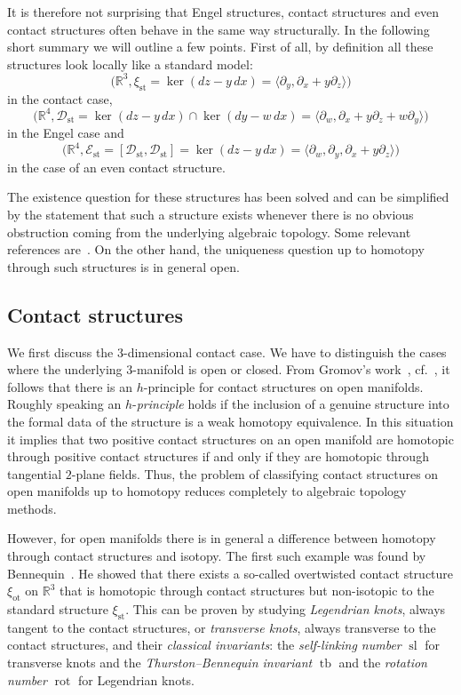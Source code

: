 \documentclass{amsart} %
\DeclareMathOperator{\tb}{tb}
\DeclareMathOperator{\rot}{rot}
\DeclareMathOperator{\slf}{sl}
\newcommand{\R}{\mathbb{R}}
\newcommand{\xist}{\xi_{\mathrm{st}}}
\newcommand{\xiot}{\xi_{\mathrm{ot}}}
\newcommand{\Dst}{\mathcal{D}_{\mathrm{st}}}
\newcommand{\Est}{\mathcal{E}_{\mathrm{st}}}
\theoremstyle{thm}
\theoremstyle{definition}
\begin{document}
It is therefore not surprising that Engel structures, contact structures and even contact structures often behave in the same way structurally. In the following short summary we will outline a few points. First of all, by definition all these structures look locally like a standard model:
$$\big(\R^3,\xist=\ker(dz-y\,dx)=\langle\partial_y,\partial_x+y\partial_z\rangle\big)$$ 
in the contact case, 
$$\big(\R^4,\Dst=\ker(dz-y\,dx)\cap\ker(dy-w\,dx)=\langle\partial_w,\partial_x+y\partial_z+w\partial_y\rangle\big)$$ 
in the Engel case and 
$$\big(\R^4,\Est=[\Dst,\Dst]=\ker(dz-y\,dx)=\langle\partial_w,\partial_y,\partial_x+y\partial_z\rangle\big)$$ 
in the case of an even contact structure.

The existence question for these structures has been solved and can be simplified by the statement that such a structure exists whenever there is no obvious obstruction coming from the underlying algebraic topology. Some relevant references are~\cite{Gr86, EM02, Ma71, El89, Ge08, Mc87, Vo09, CPPP17,PV20, BEM15}. On the other hand, the uniqueness question up to homotopy through such structures is in general open. 

\subsection{Contact structures}
We first discuss the $3$-dimensional contact case.  We have to distinguish the cases where the underlying $3$-manifold is open or closed. 
From Gromov's work~\cite{Gr86}, cf.~\cite{EM02}, it follows that there is an $h$-principle for contact structures on open manifolds. Roughly speaking an $h$-\textit{principle} holds if the inclusion of a genuine structure into the formal data of the structure is a weak homotopy equivalence. In this situation it implies that two positive contact structures on an open manifold are homotopic through positive contact structures if and only if they are homotopic through tangential $2$-plane fields. Thus, the problem of classifying contact structures on open manifolds up to homotopy reduces completely to algebraic topology methods. 

However, for open manifolds there is in general a difference between homotopy through contact structures and isotopy. The first such example was found by Bennequin~\cite{Be82}. He showed that there exists a so-called overtwisted contact structure $\xiot$ on $\R^3$ that is homotopic through contact structures but non-isotopic to the standard structure $\xist$. This can be proven by studying \textit{Legendrian knots}, always tangent to the contact structures, or \textit{transverse knots}, always transverse to the contact structures, and their \textit{classical invariants}: the \textit{self-linking number} $\slf$ for transverse knots and the \textit{Thurston--Bennequin invariant} $\tb$ and the \textit{rotation number} $\rot$ for Legendrian knots. 
\end{document}
